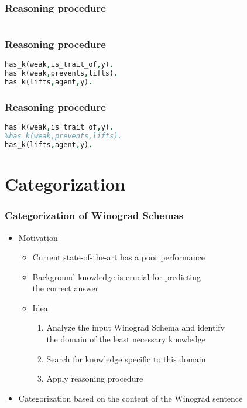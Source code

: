 \documentclass[c,8pt,xcolor...,x11names]{beamer}
\begin{document}
\begin{frame}[fragile]
\frametitle{Reasoning procedure}
\begin{columns}
	\begin{column}{0.70\textwidth}
	
	\end{column}	
\end{columns}
\end{frame}

\begin{frame}[fragile]
\frametitle{Reasoning procedure}

\centering


\begin{lstlisting}[language = Prolog, style=SC, numbers=right,
numberstyle=\tiny]
has_k(weak,is_trait_of,y). 		
has_k(weak,prevents,lifts).	 	
has_k(lifts,agent,y).		
\end{lstlisting}
\end{frame}

\begin{frame}[fragile]
\frametitle{Reasoning procedure}

\centering


\begin{lstlisting}[language = Prolog, style=SC, numbers=right,
numberstyle=\tiny]
has_k(weak,is_trait_of,y). 		
%has_k(weak,prevents,lifts).	 	
has_k(lifts,agent,y).		
\end{lstlisting}
\end{frame}

\section{Categorization} 

\begin{frame}[fragile]
\frametitle{Categorization of Winograd Schemas}

	\begin{itemize}		
	\normalsize
	\item Motivation
	\begin{itemize}
		\normalsize
		\item Current state-of-the-art has a poor performance
		\item Background knowledge is crucial for predicting\\ the correct answer 
		\onslide<2->			\item Idea
		\onslide<2->		\begin{enumerate}
			\normalsize 
			\item Analyze the input Winograd Schema and identify \\the domain of the \alert{least necessary} knowledge
			\item Search for knowledge \alert{specific} to this domain
			\item Apply reasoning procedure 
		
		\end{enumerate}
	\end{itemize}
	\item  Categorization based on the \alert{content} of the Winograd sentence
\end{itemize}   
\end{frame}
\end{document}
